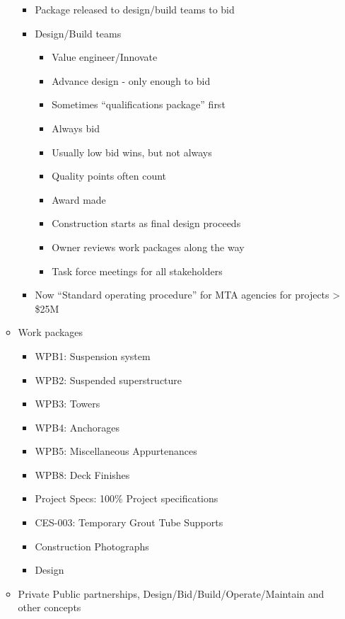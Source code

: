 \documentclass{article}
\begin{document}
\begin{itemize}
\begin{itemize}
\begin{itemize}
            \item Package released to design/build teams to bid
            \item Design/Build teams
            \begin{itemize}
                \item Value engineer/Innovate
                \item Advance design - only enough to bid
                \item Sometimes ``qualifications package'' first
                \item Always bid
                \item Usually low bid wins, but not always
                \item Quality points often count
                \item Award made
                \item Construction starts as final design proceeds
                \item Owner reviews work packages along the way
                \item Task force meetings for all stakeholders
            \end{itemize}
            \item Now ``Standard operating procedure'' for MTA agencies for projects > \$25M
        \end{itemize}
        \item Work packages
        \begin{itemize}
            \item WPB1: Suspension system
            \item WPB2: Suspended superstructure
            \item WPB3: Towers
            \item WPB4: Anchorages
            \item WPB5: Miscellaneous Appurtenances
            \item WPB8: Deck Finishes
            \item Project Specs: 100\% Project specifications
            \item CES-003: Temporary Grout Tube Supports
            \item Construction Photographs
            \item Design
        \end{itemize}
        \item Private Public partnerships, Design/Bid/Build/Operate/Maintain and other concepts

\end{itemize}
\end{itemize}
\end{document}
